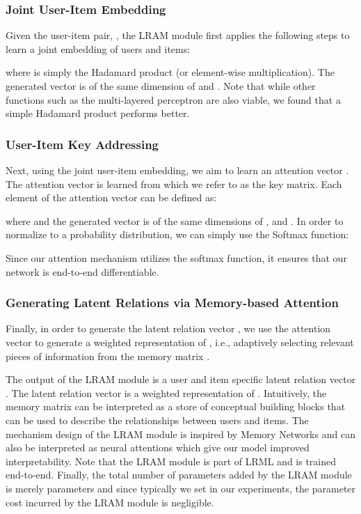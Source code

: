 \documentclass[sigconf]{acmart}
\begin{document}
\subsubsection{Joint User-Item Embedding}
Given the user-item pair, , the LRAM module first applies the following steps to learn a joint embedding of users and items:

where  is simply the Hadamard product (or element-wise multiplication). The generated vector  is of the same dimension of  and . Note that while other functions such as the multi-layered perceptron  are also viable, we found that a simple Hadamard product performs better. 

\subsubsection{User-Item Key Addressing}
Next, using the joint user-item embedding, we aim to learn an attention vector . The attention vector is learned from  which we refer to as the key matrix. Each element of the attention vector  can be defined as:

where  and the generated vector  is of the same dimensions of ,  and . In order to normalize  to a probability distribution, we can simply use the Softmax function:


Since our attention mechanism utilizes the softmax function, it ensures that our network is end-to-end differentiable. 
\subsubsection{Generating Latent Relations via Memory-based Attention}
Finally, in order to generate the latent relation vector , we use the attention vector  to generate a weighted representation of , i.e., adaptively selecting relevant pieces of information from the memory matrix .

The output of the LRAM module is a user and item specific latent relation vector . The latent relation vector is a weighted representation of . Intuitively, the memory matrix  can be interpreted as a store of conceptual building blocks that can be used to describe the relationships between users and items. The mechanism design of the LRAM module is inspired by Memory Networks and can also be interpreted as neural attentions which give our model improved interpretability. Note that the LRAM module is part of \textsc{LRML} and is trained end-to-end. Finally, the total number of parameters added by the LRAM module is merely  parameters and since typically we set  in our experiments, the parameter cost incurred by the LRAM module is negligible.   
\end{document}
